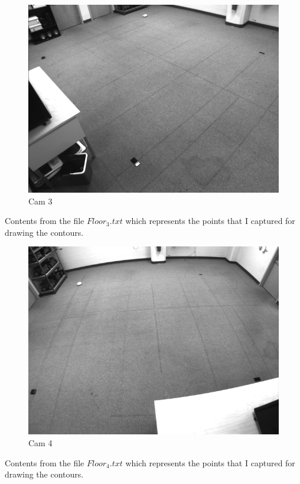 \documentclass{article}
\begin{document}
\begin{enumerate}
\begin{figure}[!htb]
    \centering
  		\includegraphics[scale=0.5]{Background3.png}
  		\caption{ Cam 3\\}
  \end{figure}
Contents from  the file $Floor_3.txt$ which represents the points that I captured for drawing the contours.


\newpage
\begin{figure}[!htb]
    \centering
  		\includegraphics[scale=0.5]{Background4.png}
  		\caption{ Cam 4}
 \end{figure}
Contents from  the file $Floor_4.txt$ which represents the points that I captured for drawing the contours.



\end{enumerate}
\end{document}
